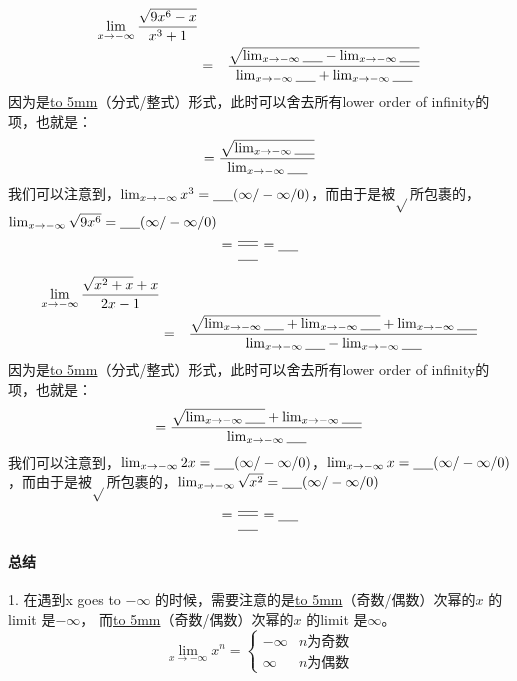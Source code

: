 \documentclass[UTF8]{ctexart}
\begin{document}
 \begin{eqnarray*}
{\lim_{x \to -\infty} \frac{\sqrt{9x^6-x}}{x^3+1}} \\
& = & \frac{\sqrt{{\lim_{x \to -\infty} \underline{\hbox to 5mm{}}}-{\lim_{x \to -\infty} \underline{\hbox to 5mm{}}}}}{{\lim_{x \to -\infty} \underline{\hbox to 5mm{}}}+{\lim_{x \to -\infty} \underline{\hbox to 5mm{}}}}
\end{eqnarray*}
因为是\underline{\hbox to 5mm{}}（分式/整式）形式，此时可以舍去所有lower order of infinity的项，也就是：
\[ = \frac{\sqrt{{\lim_{x \to -\infty} \underline{\hbox to 5mm{}}}}}{{\lim_{x \to -\infty} \underline{\hbox to 5mm{}}}}\]
我们可以注意到，${\lim_{x \to -\infty} x^3} = \underline{\hbox to 5mm{}}(\infty / -\infty / 0)$，而由于是被$\sqrt{ }$所包裹的，${\lim_{x \to -\infty} \sqrt{9x^6}} = \underline{\hbox to 5mm{}}(\infty / -\infty / 0)$ 
\[ = \frac{\underline{\hbox to 5mm{}}}{\underline{\hbox to 5mm{}}} = \underline{\hbox to 5mm{}}\]

 \begin{eqnarray*}
{\lim_{x \to -\infty} \frac{\sqrt{x^2+x}+x}{2x-1}} \\
& = & \frac{\sqrt{{\lim_{x \to -\infty} \underline{\hbox to 5mm{}}}+{\lim_{x \to -\infty} \underline{\hbox to 5mm{}}}}+{\lim_{x \to -\infty} \underline{\hbox to 5mm{}}}}{{\lim_{x \to -\infty} \underline{\hbox to 5mm{}}} - {\lim_{x \to -\infty} \underline{\hbox to 5mm{}}}}
\end{eqnarray*}
因为是\underline{\hbox to 5mm{}}（分式/整式）形式，此时可以舍去所有lower order of infinity的项，也就是：
\[ = \frac{\sqrt{{\lim_{x \to -\infty} \underline{\hbox to 5mm{}}}}+{\lim_{x \to -\infty} \underline{\hbox to 5mm{}}}}{{\lim_{x \to -\infty} \underline{\hbox to 5mm{}}}}\]
我们可以注意到，${\lim_{x \to -\infty} 2x} = \underline{\hbox to 5mm{}}(\infty / -\infty / 0)$，${\lim_{x \to -\infty} x} = \underline{\hbox to 5mm{}}(\infty / -\infty / 0)$，而由于是被$\sqrt{ }$所包裹的，${\lim_{x \to -\infty} \sqrt{x^2}} = \underline{\hbox to 5mm{}}(\infty / -\infty / 0)$ 
\[ = \frac{\underline{\hbox to 5mm{}}}{\underline{\hbox to 5mm{}}} = \underline{\hbox to 5mm{}}\]

\paragraph{总结}
1. 在遇到x goes to $-\infty$ 的时候，需要注意的是\underline{\hbox to 5mm{}}（奇数/偶数）次幂的$x$ 的limit 是$-\infty$， 而\underline{\hbox to 5mm{}}（奇数/偶数）次幂的$x$ 的limit 是$\infty$。
\[{\lim_{x \to -\infty} x^n = 
\begin{cases}
-\infty & n \text{为奇数}\\
\infty & n \text{为偶数}
\end{cases}
}\]
\end{document}
